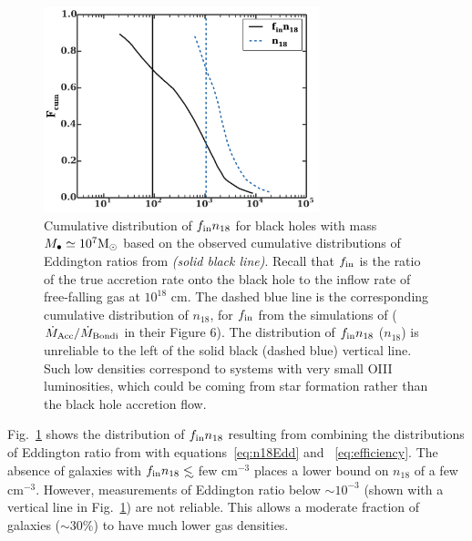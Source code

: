 \documentclass[usenatbib,fleqn]{mnras}
\newcommand\lsim{\mathrel{\rlap{\lower4pt\hbox{\hskip1pt$\sim$}}
    \raise1pt\hbox{$<$}}}
\newcommand{\Mbh}[1][]{M_{\bullet#1}}
\newcommand{\Msun}{{\rm M_\odot}}
\begin{document}
\begin{figure}
\includegraphics[width=8cm]{fcum_n18.pdf}
\caption{\label{fig:n18Cum} Cumulative distribution of $f_{\rm in}
  n_{18}$ for black holes with mass $\Mbh\simeq 10^{7} \Msun$ based on
  the observed cumulative distributions of Eddington ratios from
  \citet{Kauffmann&Heckman2009} {\it (solid black line)}. Recall that
  $f_{\rm in}$ is the ratio of the true accretion rate onto the black
  hole to the inflow rate of free-falling gas at $10^{18}$ cm.  The
  dashed blue line is the corresponding cumulative distribution of
  $n_{18}$, for $f_{\rm in}$ from the simulations of \citet{Li+2013}
  ($\dot{M}_{\rm Acc}/\dot{M}_{\rm Bondi}$ in their Figure 6). The
  distribution of $f_{\rm in} n_{18}$ ($n_{18}$) is unreliable to the
  left of the solid black (dashed blue) vertical line. Such low
  densities correspond to systems with very small OIII luminosities,
  which could be coming from star formation rather than the black hole
  accretion flow.}
\end{figure}


Fig.~\ref{fig:n18Cum} shows the distribution of $f_{\rm in} n_{18}$
resulting from combining the distributions of Eddington ratio from
\citet{Kauffmann&Heckman2009} with equations~\eqref{eq:n18Edd} and
~\eqref{eq:efficiency}.  The absence of galaxies with $f_{\rm in
}n_{18} \lsim$ few cm$^{-3}$ places a lower bound on $n_{18}$ of a few
cm$^{-3}$.  However, measurements of Eddington ratio below $\sim
10^{-3}$ (shown with a vertical line in Fig.~\ref{fig:n18Cum}) are not
reliable. This allows a moderate fraction of galaxies ($\sim 30\%$) to
have much lower gas densities.
\end{document}
